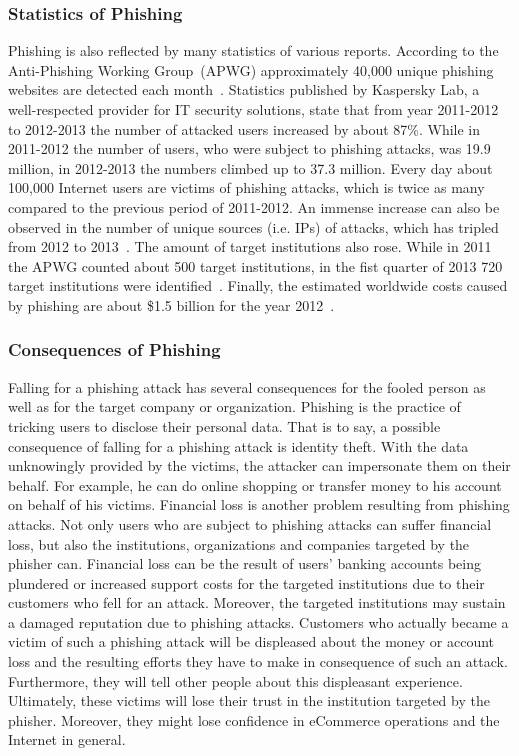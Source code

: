 \subsubsection{Statistics of Phishing}
\label{s:stats}
Phishing is also reflected by many statistics of various reports. According to the Anti-Phishing Working Group~(APWG) approximately 40,000 unique phishing websites are detected each month~\cite{antiphishingtrendreport2013}. Statistics published by Kaspersky Lab, a well-respected provider for IT security solutions, state that from year 2011-2012 to 2012-2013 the number of attacked users increased by about 87\%. While in 2011-2012 the number of users, who were subject to phishing attacks, was 19.9 million, in 2012-2013 the numbers climbed up to 37.3 million. Every day about 100,000 Internet users are victims of phishing attacks, which is twice as many compared to the previous period of 2011-2012. An immense increase can also be observed in the number of unique sources (i.e. IPs) of attacks, which has tripled from 2012 to 2013~\cite{kasperskyreport2013}. The amount of target institutions also rose. While in 2011 the APWG counted about 500 target institutions, in the fist quarter of 2013 720 target institutions were identified~\cite{antiphishingglobalreport2013}. Finally, the estimated worldwide costs caused by phishing are about \$1.5 billion for the year 2012~\cite{rsa2013}.


\subsubsection{Consequences of Phishing}
Falling for a phishing attack has several consequences for the fooled person as well as for the target company or organization. Phishing is the practice of tricking users to disclose their personal data. That is to say, a possible consequence of falling for a phishing attack is identity theft. With the data unknowingly provided by the victims, the attacker can impersonate them on their behalf. For example, he can do online shopping or transfer money to his account on behalf of his victims. Financial loss is another problem resulting from phishing attacks. Not only users who are subject to phishing attacks can suffer financial loss, but also the institutions, organizations and companies targeted by the phisher can. Financial loss can be the result of users' banking accounts being plundered or increased support costs for the targeted institutions due to their customers who fell for an attack. Moreover, the targeted institutions may sustain a damaged reputation due to phishing attacks. Customers who actually became a victim of such a phishing attack will be displeased about the money or account loss and the resulting efforts they have to make in consequence of such an attack. Furthermore, they will tell other people about this displeasant experience. Ultimately, these victims will lose their trust in the institution targeted by the phisher. Moreover, they might lose confidence in eCommerce operations and the Internet in general.

